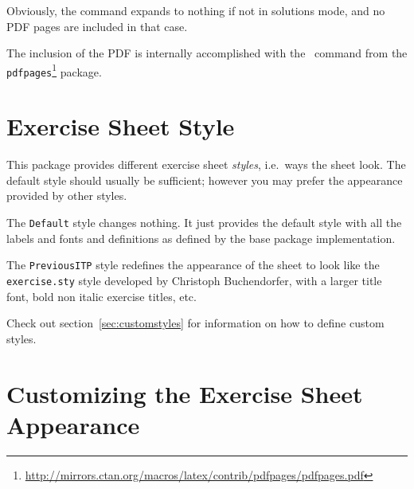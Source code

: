 \documentclass[11pt,a4paper]{article}
\begin{document}
Obviously, the command expands to nothing if not in solutions mode, and no PDF pages are
included in that case.

The inclusion of the PDF is internally accomplished with the~ command
from the
\texttt{pdfpages}\footnote{\url{http://mirrors.ctan.org/macros/latex/contrib/pdfpages/pdfpages.pdf}}
package.





\section{Exercise Sheet Style}
\label{sec:styles}

This package provides different exercise sheet \emph{styles}, i.e.\ ways the sheet
look. The default style should usually be sufficient; however you may prefer the
appearance provided by other styles.


The \texttt{Default} style changes nothing. It just provides the default style with all
the labels and fonts and definitions as defined by the base package implementation.

The \texttt{PreviousITP} style redefines the appearance of the sheet to look like the
\texttt{exercise.sty} style developed by Christoph Buchendorfer, with a larger title font,
bold non italic exercise titles, etc.

Check out section~\ref{sec:customstyles} for information on how to define custom styles.

\section{Customizing the Exercise Sheet Appearance}
\label{sec:CustomizeSheet}
\end{document}
